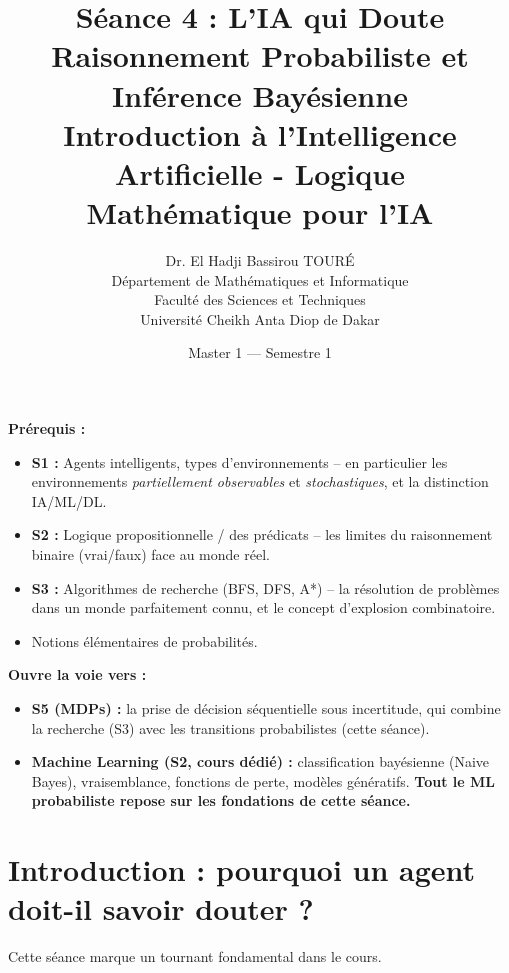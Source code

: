 \documentclass[11pt,a4paper]{article}
\title{\textbf{Séance 4 : L'IA qui Doute}\\
\large Raisonnement Probabiliste et Inférence Bayésienne\\[0.5cm]
\normalsize Introduction à l'Intelligence Artificielle - Logique Mathématique pour l'IA}
\author{Dr. El Hadji Bassirou TOURÉ\\
Département de Mathématiques et Informatique\\
Faculté des Sciences et Techniques\\
Université Cheikh Anta Diop de Dakar}
\date{Master 1 --- Semestre 1}
\begin{document}
\maketitle

\begin{prereqbox}
\textbf{Prérequis :}
\begin{itemize}[nosep]
    \item \textbf{S1 :} Agents intelligents, types d'environnements -- en particulier les environnements \textit{partiellement observables} et \textit{stochastiques}, et la distinction IA/ML/DL.
    \item \textbf{S2 :} Logique propositionnelle / des prédicats -- les limites du raisonnement binaire (vrai/faux) face au monde réel.
    \item \textbf{S3 :} Algorithmes de recherche (BFS, DFS, A*) -- la résolution de problèmes dans un monde parfaitement connu, et le concept d'explosion combinatoire.
    \item Notions élémentaires de probabilités.
\end{itemize}

\textbf{Ouvre la voie vers :}
\begin{itemize}[nosep]
    \item \textbf{S5 (MDPs) :} la prise de décision séquentielle sous incertitude, qui combine la recherche (S3) avec les transitions probabilistes (cette séance).
    \item \textbf{Machine Learning (S2, cours dédié) :} classification bayésienne (Naive Bayes), vraisemblance, fonctions de perte, modèles génératifs. \textbf{Tout le ML probabiliste repose sur les fondations de cette séance.}
\end{itemize}
\end{prereqbox}

\vspace{0.5cm}

\tableofcontents

\newpage

\section{Introduction : pourquoi un agent doit-il savoir douter ?}

Cette séance marque un tournant fondamental dans le cours.
\end{document}
